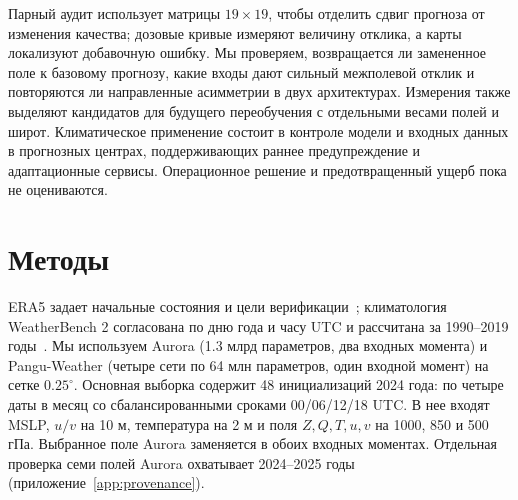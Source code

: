 \documentclass{article}
\begin{document}
Парный аудит использует матрицы $19\!\times\!19$, чтобы отделить сдвиг прогноза от изменения качества; дозовые кривые измеряют величину отклика, а карты локализуют добавочную ошибку. Мы проверяем, возвращается ли замененное поле к базовому прогнозу, какие входы дают сильный межполевой отклик и повторяются ли направленные асимметрии в двух архитектурах. Измерения также выделяют кандидатов для будущего переобучения с отдельными весами полей и широт. Климатическое применение состоит в контроле модели и входных данных в прогнозных центрах, поддерживающих раннее предупреждение и адаптационные сервисы. Операционное решение и предотвращенный ущерб пока не оцениваются.

\section{Методы}

ERA5 задает начальные состояния и цели верификации~\citep{hersbach2020era5}; климатология WeatherBench 2 согласована по дню года и часу UTC и рассчитана за 1990--2019 годы~\citep{rasp2024weatherbench2}. Мы используем Aurora (1.3 млрд параметров, два входных момента) и Pangu-Weather (четыре сети по 64 млн параметров, один входной момент) на сетке $0.25^\circ$. Основная выборка содержит 48 инициализаций 2024 года: по четыре даты в месяц со сбалансированными сроками 00/06/12/18 UTC. В нее входят MSLP, $u/v$ на 10 м, температура на 2 м и поля $Z,Q,T,u,v$ на 1000, 850 и 500 гПа. Выбранное поле Aurora заменяется в обоих входных моментах. Отдельная проверка семи полей Aurora охватывает 2024--2025 годы (приложение~\ref{app:provenance}).
\end{document}
